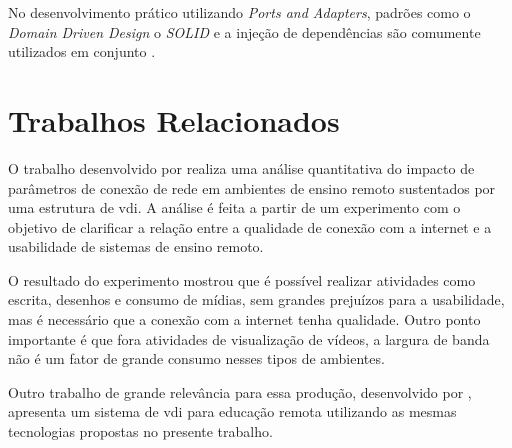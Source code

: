 No desenvolvimento prático utilizando \textit{Ports and Adapters}, padrões como o \textit{Domain Driven Design} o \textit{SOLID} e a injeção de dependências são comumente utilizados em conjunto \citep{cockburn2017}.










\section{Trabalhos Relacionados}
\label{sec:trabalhosRelacionados}

O trabalho desenvolvido por \citet{qoselearning} realiza uma análise quantitativa do impacto de
parâmetros de conexão de rede em ambientes de ensino remoto sustentados por uma estrutura de \gls{vdi}.
A análise é feita a partir de um experimento com o objetivo de clarificar a relação entre a qualidade de
conexão com a internet e a usabilidade de sistemas de ensino remoto.

O resultado do experimento mostrou que é possível realizar atividades como escrita, desenhos e
consumo de mídias, sem grandes prejuízos para a usabilidade, mas é necessário que a conexão com a
internet tenha qualidade. Outro ponto importante é que fora atividades de visualização de vídeos, a
largura de banda não é um fator de grande consumo nesses tipos de ambientes.

Outro trabalho de grande relevância para essa produção, desenvolvido por \citet{edufirestick},
apresenta um sistema de \gls{vdi} para educação remota utilizando as mesmas tecnologias propostas
no presente trabalho. 

